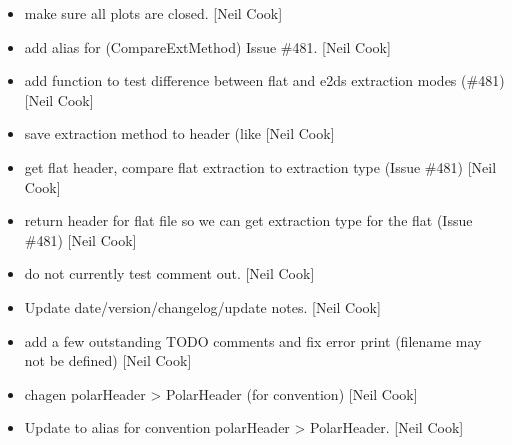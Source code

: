 \documentclass[a4paper,10pt,english]{report}
\begin{document}
\label{\detokenize{misc/changelog:id316}}\begin{itemize}
\item {} 
 \sphinxhyphen{} make sure all plots are closed. {[}Neil Cook{]}

\item {} 
 \sphinxhyphen{} add alias for 
(CompareExtMethod) \sphinxhyphen{} Issue \#481. {[}Neil Cook{]}

\item {} 
 \sphinxhyphen{} add  function to test
difference between flat and e2ds extraction modes (\#481) {[}Neil Cook{]}

\item {} 
 \sphinxhyphen{} save extraction method to header (like
 {[}Neil Cook{]}

\item {} 
 \sphinxhyphen{} get flat header, compare flat extraction
to extraction type  (Issue \#481) {[}Neil Cook{]}

\item {} 
 \sphinxhyphen{} return header for flat file so we can get extraction
type for the flat (Issue \#481) {[}Neil Cook{]}

\item {} 
 \sphinxhyphen{} do not currently test  \sphinxhyphen{}
comment out. {[}Neil Cook{]}

\item {} 
Update date/version/changelog/update notes. {[}Neil Cook{]}

\item {} 
 \sphinxhyphen{} add a few outstanding TODO comments and fix error print
(filename may not be defined) {[}Neil Cook{]}

\item {} 
 \sphinxhyphen{} chagen polarHeader \textendash{}\textgreater{} PolarHeader (for
convention) {[}Neil Cook{]}

\item {} 
 \sphinxhyphen{} Update to alias for convention polarHeader \textendash{}\textgreater{}
PolarHeader. {[}Neil Cook{]}


\end{itemize}
\end{document}
